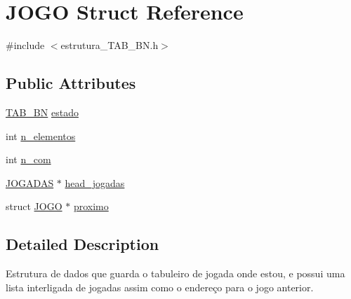 \hypertarget{structJOGO}{\section{J\-O\-G\-O Struct Reference}
\label{structJOGO}
}


{\ttfamily \#include $<$estrutura\-\_\-\-T\-A\-B\-\_\-\-B\-N.\-h$>$}

\subsection*{Public Attributes}
\begin{DoxyCompactItemize}
\item 
\hyperlink{estrutura__TAB__BN_8h_a71a4477e2433da6b70d13b4c01b28917}{T\-A\-B\-\_\-\-B\-N} \hyperlink{structJOGO_a8be710a209c24ac0f77dc6ec345131c0}{estado}
\item 
int \hyperlink{structJOGO_a207d5e6dc2e307c6ecabe6d593b06a35}{n\-\_\-elementos}
\item 
int \hyperlink{structJOGO_a8a2e1124aa5a80bca5be947df1d1d5e4}{n\-\_\-com}
\item 
\hyperlink{structJOGADAS}{J\-O\-G\-A\-D\-A\-S} $\ast$ \hyperlink{structJOGO_ae6a10fd45e48577ebe24ce85f0d3ce66}{head\-\_\-jogadas}
\item 
struct \hyperlink{structJOGO}{J\-O\-G\-O} $\ast$ \hyperlink{structJOGO_a2657c0fd23964f1adde229f158aa73bd}{proximo}
\end{DoxyCompactItemize}


\subsection{Detailed Description}
Estrutura de dados que guarda o tabuleiro de jogada onde estou, e possui uma lista interligada de jogadas assim como o endereço para o jogo anterior. 

